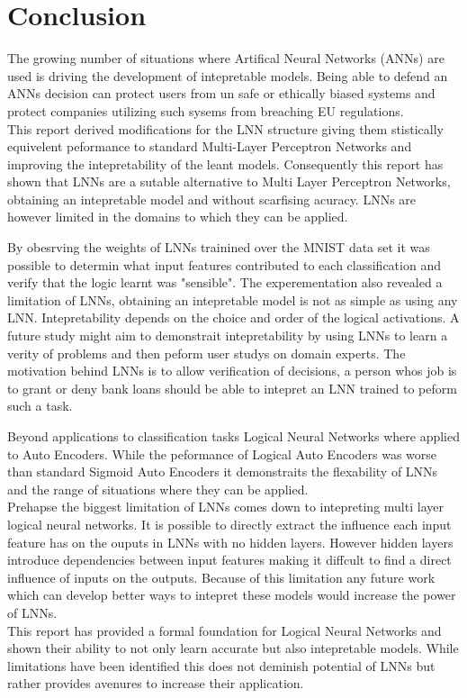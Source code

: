 \chapter{Conclusion}\label{C:con}
The growing number of situations where Artifical Neural Networks (ANNs) are used is driving the development of intepretable models. Being able to defend an ANNs decision can protect users from un safe or ethically biased systems and protect companies utilizing such sysems from breaching EU regulations.\\

This report derived modifications for the LNN structure giving them stistically equivelent peformance to standard Multi-Layer Perceptron Networks and improving the intepretability of the leant models. Consequently this report has shown that LNNs are a sutable alternative to Multi Layer Perceptron Networks, obtaining an intepretable model and without scarfising acuracy. LNNs are however limited in the domains to which they can be applied.

By obesrving the weights of LNNs trainined over the MNIST data set it was possible to determin what input features contributed to each classification and verify that the logic learnt was "sensible".  The experementation also revealed a limitation of LNNs, obtaining an intepretable model is not as simple as using any LNN. Intepretability depends on the choice and order of the logical activations. A future study might aim to demonstrait intepretability by using LNNs to learn a verity of problems and then peform user studys on domain experts. The motivation behind LNNs is to allow verification of decisions, a person whos job is to grant or deny bank loans should be able to intepret an LNN trained to peform such a task.

Beyond applications to classification tasks Logical Neural Networks where applied to Auto Encoders. While the peformance of Logical Auto Encoders was worse than standard Sigmoid Auto Encoders it demonstraits the flexability of LNNs and the range of situations where they can be applied.\\

Prehapse the biggest limitation of LNNs comes down to intepreting multi layer logical neural networks. It is possible to directly extract the influence each input feature has on the ouputs in LNNs with no hidden layers. However hidden layers introduce dependencies between input features making it diffcult to find a direct influence of inputs on the outputs. Because of this limitation any future work which can develop better ways to intepret these models would increase the power of LNNs.\\

This report has provided a formal foundation for Logical Neural Networks and shown their ability to not only learn accurate but also intepretable models. While limitations have been identified this does not deminish potential of LNNs but rather provides avenures to increase their application.






